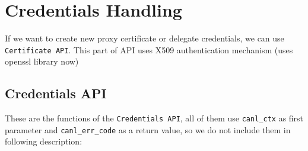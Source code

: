%
%

\section{Credentials Handling}
\label{s:cs-auth-conn}

If we want to create new proxy certificate or \Eg delegate
credentials, we can use \CANL \verb'Certificate API'.
This part of API uses X509 authentication mechanism 
(uses openssl library now)

\subsection{Credentials API}
These are the functions of the \verb'Credentials API', all of them use
\verb'canl_ctx' as first parameter and \verb'canl_err_code' as a return
value, so we do not include them in following description:

